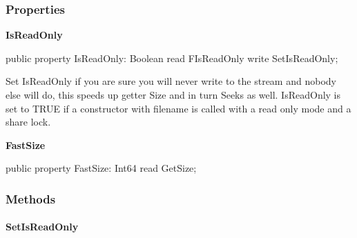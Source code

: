 \documentclass{report}
\newif\ifpdf
\begin{document}
\subsubsection*{\large{\textbf{Properties}}\normalsize\hspace{1ex}\hfill}
\begin{list}{}{
\setlength{\itemindent}{0cm}
\setlength{\listparindent}{0cm}
\setlength{\leftmargin}{\evensidemargin}
\addtolength{\leftmargin}{\tmplength}
\settowidth{\labelsep}{X}
\addtolength{\leftmargin}{\labelsep}
\setlength{\labelwidth}{\tmplength}
}
\label{PasDoc_StreamUtils.TBufferedStream-IsReadOnly}
\item[\textbf{IsReadOnly}\hfill]
\ifpdf
\begin{flushleft}
\fi
\begin{ttfamily}
public property IsReadOnly: Boolean read FIsReadOnly write SetIsReadOnly;\end{ttfamily}

\ifpdf
\end{flushleft}
\fi


\par Set IsReadOnly if you are sure you will never write to the stream and nobody else will do, this speeds up getter Size and in turn Seeks as well. IsReadOnly is set to TRUE if a constructor with filename is called with a read only mode and a share lock.\label{PasDoc_StreamUtils.TBufferedStream-FastSize}
\item[\textbf{FastSize}\hfill]
\ifpdf
\begin{flushleft}
\fi
\begin{ttfamily}
public property FastSize: Int64 read GetSize;\end{ttfamily}

\ifpdf
\end{flushleft}
\fi


\par  \end{list}
\subsubsection*{\large{\textbf{Methods}}\normalsize\hspace{1ex}\hfill}
\paragraph*{SetIsReadOnly}\hspace*{\fill}
\end{document}
